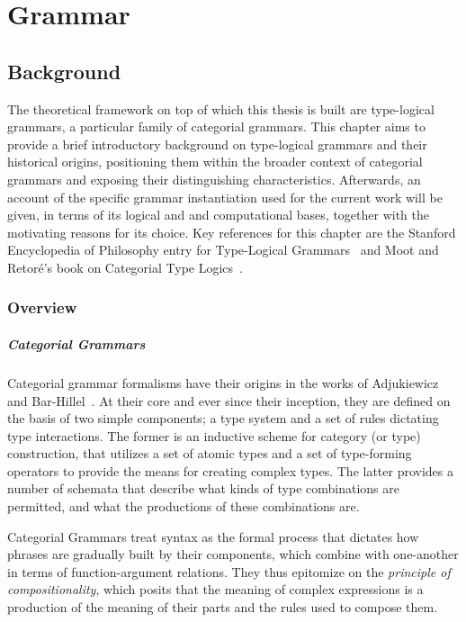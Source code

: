\chapter{Grammar}
\label{chapter:tlg}

\section{Background}
The theoretical framework on top of which this thesis is built are type-logical grammars, a particular family of categorial grammars.
This chapter aims to provide a brief introductory background on type-logical grammars and their historical origins, positioning them within the broader context of categorial grammars and exposing their distinguishing characteristics.
Afterwards, an account of the specific grammar instantiation used for the current work will be given, in terms of its logical and and computational bases, together with the motivating reasons for its choice.
Key references for this chapter are the Stanford Encyclopedia of Philosophy entry for Type-Logical Grammars~\cite{sep-typelogical-grammar} and Moot and Retor{\'e}'s book on Categorial Type Logics~\cite{moot2012logic}.

\subsection{Overview}
\paragraph{Categorial Grammars}
Categorial grammar formalisms have their origins in the works of  Adjukiewicz~\cite{ajdukiewicz1935syntaktische} and Bar-Hillel~\cite{bar1953quasi}.
At their core and ever since their inception, they are defined on the basis of two simple components; a type system and a set of rules dictating type interactions.
The former is an inductive scheme for category (or type) construction, that utilizes a set of atomic types and a set of type-forming operators to provide the means for creating complex types.
The latter provides a number of schemata that describe what kinds of type combinations are permitted, and what the productions of these combinations are.

Categorial Grammars treat syntax as the formal process that dictates how phrases are gradually built by their components, which combine with one-another in terms of function-argument relations. 
They thus epitomize on the \textit{principle of compositionality}, which posits that the meaning of complex expressions is a production of the meaning of their parts and the rules used to compose them.

